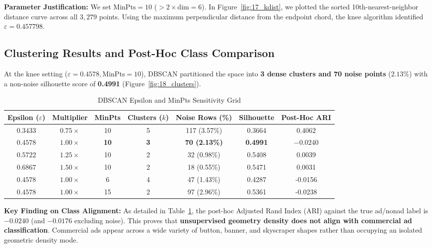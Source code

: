 \documentclass[11pt,a4paper]{article}
\begin{document}
\noindent\textbf{Parameter Justification:} We set $\text{MinPts} = 10$ ($> 2 \times \text{dim} = 6$). In Figure~\ref{fig:17_kdist}, we plotted the sorted 10th-nearest-neighbor distance curve across all $3{,}279$ points. Using the maximum perpendicular distance from the endpoint chord, the knee algorithm identified $\varepsilon = 0.457798$.

\subsection{Clustering Results and Post-Hoc Class Comparison}
At the knee setting ($\varepsilon = 0.4578, \text{MinPts} = 10$), DBSCAN partitioned the space into \textbf{3 dense clusters and 70 noise points} ($2.13\%$) with a non-noise silhouette score of \textbf{0.4991} (Figure~\ref{fig:18_clusters}).

\begin{table}[H]
\centering
\small
\caption{DBSCAN Epsilon and MinPts Sensitivity Grid}
\label{tab:dbscan_sensitivity}
\begin{tabular}{ccccccc}
\toprule
\textbf{Epsilon ($\varepsilon$)} & \textbf{Multiplier} & \textbf{MinPts} & \textbf{Clusters ($k$)} & \textbf{Noise Rows (\%)} & \textbf{Silhouette} & \textbf{Post-Hoc ARI} \\
\midrule
$0.3433$ & $0.75\times$ & 10 & 5 & 117 (3.57\%) & 0.3664 & 0.4062 \\
$\mathbf{0.4578}$ & $\mathbf{1.00\times}$ & \textbf{10} & \textbf{3} & \textbf{70 (2.13\%)} & \textbf{0.4991} & $\mathbf{-0.0240}$ \\
$0.5722$ & $1.25\times$ & 10 & 2 & 32 (0.98\%) & 0.5408 & 0.0039 \\
$0.6867$ & $1.50\times$ & 10 & 2 & 18 (0.55\%) & 0.5471 & 0.0031 \\
$0.4578$ & $1.00\times$ & 6 & 4 & 47 (1.43\%) & 0.4287 & -0.0156 \\
$0.4578$ & $1.00\times$ & 15 & 2 & 97 (2.96\%) & 0.5361 & -0.0238 \\
\bottomrule
\end{tabular}
\end{table}

\noindent\textbf{Key Finding on Class Alignment:} As detailed in Table~\ref{tab:dbscan_sensitivity}, the post-hoc Adjusted Rand Index (ARI) against the true ad/nonad label is $-0.0240$ (and $-0.0176$ excluding noise). This proves that \textbf{unsupervised geometry density does not align with commercial ad classification}. Commercial ads appear across a wide variety of button, banner, and skyscraper shapes rather than occupying an isolated geometric density mode.
\end{document}
